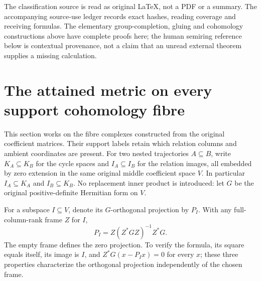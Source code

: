 \documentclass[11pt,a4paper]{article}
\theoremstyle{definition}\newtheorem{definition}[theorem]{Definition}
\begin{document}
The classification source is read as original LaTeX, not a PDF or
a summary. The accompanying source-use ledger records exact hashes,
reading coverage and receiving formulas. The elementary group-completion,
gluing and cohomology constructions above have complete proofs here;
the human semiring reference below is contextual provenance, not a
claim that an unread external theorem supplies a missing calculation.




\section{The attained metric on every support cohomology fibre}
\label{sec:support-quotient-metric}
This section works on the fibre complexes constructed from the original coefficient matrices. Their support labels retain which relation columns and ambient coordinates are present. For two nested trajectories $A\subseteq B$, write $K_A\subseteq K_B$ for the cycle spaces and $I_A\subseteq I_B$ for the relation images, all embedded by zero extension in the same original middle coefficient space $V$. In particular $I_A\subseteq K_A$ and $I_B\subseteq K_B$. No replacement inner product is introduced: let $G$ be the original positive-definite Hermitian form on $V$.

For a subspace $I\subseteq V$, denote its $G$-orthogonal projection by $P_I$. With any full-column-rank frame $Z$ for $I$,
\begin{equation}\label{eq:original-relation-projection}
 P_I=Z(Z^*GZ)^{-1}Z^*G.
\end{equation}
The empty frame defines the zero projection. To verify the formula, its square equals itself, its image is $I$, and $Z^*G(x-P_Ix)=0$ for every $x$; these three properties characterize the orthogonal projection independently of the chosen frame.
\end{document}
